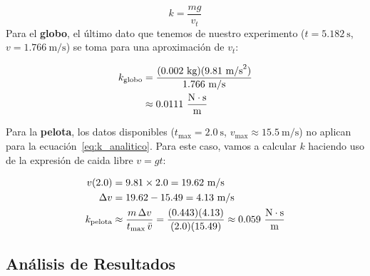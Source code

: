 \documentclass[12pt, journal]{IEEEtran}
\begin{document}
	\begin{equation}
    k = \frac{mg}{v_t}
    \label{eq:k_analitico}
	\end{equation}
	Para el \textbf{globo}, el último dato que tenemos de nuestro experimento
	($t = 5.182~\text{s}$, $v = 1.766~\text{m/s}$) se toma para una aproximación de $v_t$:

	\begin{align}
        k_{\text{globo}} &= \frac{(0.002~\text{kg})(9.81~\text{m/s}^2)}{1.766~\text{m/s}} \notag \\
        &\approx 0.0111~\frac{\text{N}\cdot\text{s}}{\text{m}}
	\end{align}

	Para la \textbf{pelota}, los datos disponibles
	($t_{\max} = 2.0~\text{s}$, $v_{\max} \approx 15.5~\text{m/s}$) no aplican para la ecuación~\eqref{eq:k_analitico}.
	Para este caso, vamos a calcular $k$ haciendo uso de la expresión de caida libre $v=gt$:

	\begin{align}
        v(2.0) &= 9.81 \times 2.0 = 19.62~\text{m/s} \notag \\
        \Delta v &= 19.62 - 15.49 = 4.13~\text{m/s} \notag \\
        k_{\text{pelota}} &\approx \frac{m\,\Delta v}{t_{\max}\,\bar{v}}
        = \frac{(0.443)(4.13)}{(2.0)(15.49)}
        \approx 0.059~\frac{\text{N}\cdot\text{s}}{\text{m}}
	\end{align}

	\subsection{Análisis de Resultados}
\end{document}
